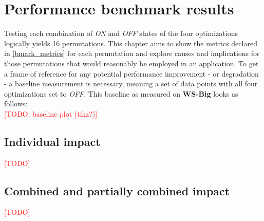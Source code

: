 
\chapter{Performance benchmark results} \label{results}
Testing each combination of \textit{ON} and \textit{OFF} states of the four optimizations logically yields 16 permutations. This chapter aims to show the metrics declared in \autoref{bmark_metrics} for each permutation and explore causes and implications for those permutations that would reasonably be employed in an application. 
To get a frame of reference for any potential performance improvement - or degradation - a baseline measurement is necessary, meaning a set of data points with all four optimizations set to \textit{OFF}. This baseline as measured on \textbf{WS-Big} looks as follows: \\

\textcolor{red}{[TODO: baseline plot (tikz?)]}

\section{Individual impact}
\textcolor{red}{[TODO]}
\section{Combined and partially combined impact}
\textcolor{red}{[TODO]}